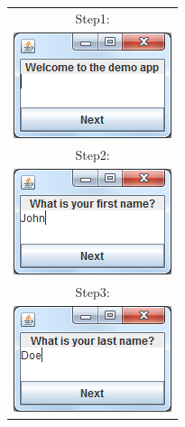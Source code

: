 \begin{figure}
\begin{minipage}{.3\linewidth}
        \begin{tabular}{c}
Step1:\\
\includegraphics[width=0.9\linewidth]{images/swing-demo-step1.png} \\[1cm] 
Step2:\\
\includegraphics[width=0.9\linewidth]{images/swing-demo-step2.png} \\[1cm]
Step3:\\
\includegraphics[width=0.9\linewidth]{images/swing-demo-step3.png} \\[1cm]

\end{tabular}
\end{minipage}
\end{figure}

